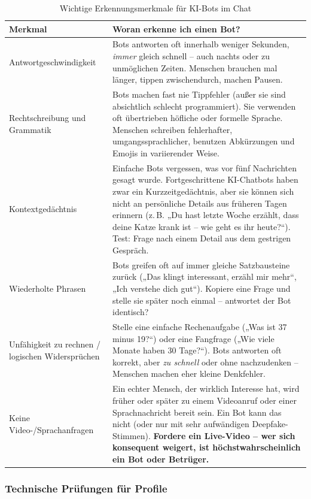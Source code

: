 \documentclass[12pt,a4paper,oneside]{scrartcl}
\begin{document}
	\begin{table}[h]
		\centering
		\begin{tabular}{p{}p{}}
			\toprule
			\textbf{Merkmal} & \textbf{Woran erkenne ich einen Bot?} \\
			\midrule
			Antwortgeschwindigkeit & Bots antworten oft innerhalb weniger Sekunden, \textit{immer} gleich schnell – auch nachts oder zu unmöglichen Zeiten. Menschen brauchen mal länger, tippen zwischendurch, machen Pausen. \\
			Rechtschreibung und Grammatik & Bots machen fast nie Tippfehler (außer sie sind absichtlich schlecht programmiert). Sie verwenden oft übertrieben höfliche oder formelle Sprache. Menschen schreiben fehlerhafter, umgangssprachlicher, benutzen Abkürzungen und Emojis in variierender Weise. \\
			Kontextgedächtnis & Einfache Bots vergessen, was vor fünf Nachrichten gesagt wurde. Fortgeschrittene KI-Chatbots haben zwar ein Kurzzeitgedächtnis, aber sie können sich nicht an persönliche Details aus früheren Tagen erinnern (z.\,B. „Du hast letzte Woche erzählt, dass deine Katze krank ist – wie geht es ihr heute?“). Test: Frage nach einem Detail aus dem gestrigen Gespräch. \\
			Wiederholte Phrasen & Bots greifen oft auf immer gleiche Satzbausteine zurück („Das klingt interessant, erzähl mir mehr“, „Ich verstehe dich gut“). Kopiere eine Frage und stelle sie später noch einmal – antwortet der Bot identisch? \\
			Unfähigkeit zu rechnen / logischen Widersprüchen & Stelle eine einfache Rechenaufgabe („Was ist 37 minus 19?“) oder eine Fangfrage („Wie viele Monate haben 30 Tage?“). Bots antworten oft korrekt, aber \textit{zu schnell} oder ohne nachzudenken – Menschen machen eher kleine Denkfehler. \\
			Keine Video-/Sprachanfragen & Ein echter Mensch, der wirklich Interesse hat, wird früher oder später zu einem Videoanruf oder einer Sprachnachricht bereit sein. Ein Bot kann das nicht (oder nur mit sehr aufwändigen Deepfake-Stimmen). \textbf{Fordere ein Live-Video – wer sich konsequent weigert, ist höchstwahrscheinlich ein Bot oder Betrüger.} \\
			\bottomrule
		\end{tabular}
		\caption{Wichtige Erkennungsmerkmale für KI-Bots im Chat}
	\end{table}
	
	\subsubsection{Technische Prüfungen für Profile}
	
\end{document}
